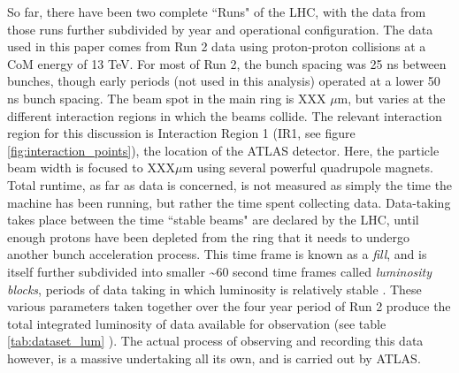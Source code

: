     So far, there have been two complete ``Runs" of the LHC, with the data from those runs further subdivided by year and operational configuration.
    The data used in this paper comes from Run 2 data using proton-proton collisions at a CoM energy of 13 TeV.
    For most of Run 2, the bunch spacing was 25 ns between bunches, though early periods (not used in this analysis) operated at a lower 50 ns bunch spacing.
    The beam spot in the main ring is XXX $\mu$m, but varies at the different interaction regions in which the beams collide.
    The relevant interaction region for this discussion is Interaction Region 1 (IR1, see figure \ref{fig:interaction_points}), the location of the ATLAS detector.
    Here, the particle beam width is focused to XXX$\mu$m using several powerful quadrupole magnets.
    Total runtime, as far as data is concerned, is not measured as simply the time the machine has been running, but rather the time spent collecting data.
    Data-taking takes place between the time ``stable beams" are declared by the LHC, until enough protons have been depleted from the ring that it needs to undergo another bunch acceleration process.
    This time frame is known as a \textit{fill}, and is itself further subdivided into smaller \textasciitilde 60 second time frames called \textit{luminosity blocks}, periods of data taking in which luminosity is relatively stable \cite{data_quality}.
    These various parameters taken together over the four year period of Run 2 produce the total integrated luminosity of data available for observation (see table \ref{tab:dataset_lum} ).
    The actual process of observing and recording this data however, is a massive undertaking all its own, and is carried out by ATLAS.
